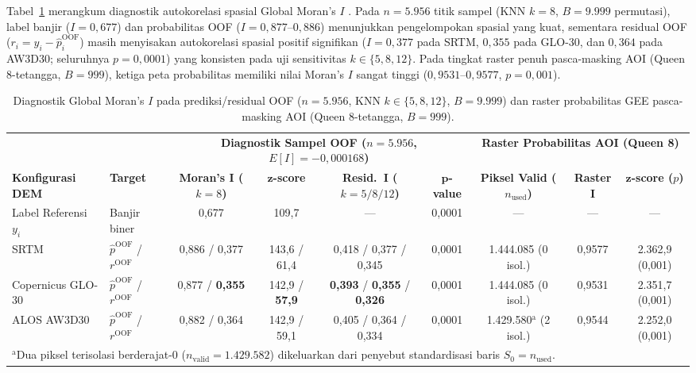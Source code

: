 \documentclass[11pt,twoside]{article}
\begin{document}
Tabel~\ref{tab:moran-id} merangkum diagnostik autokorelasi spasial Global Moran's $I$ \cite{moran1950}. Pada $n = 5.956$ titik sampel (KNN $k=8$, $B=9.999$ permutasi), label banjir ($I = 0{,}677$) dan probabilitas OOF ($I = 0{,}877\text{--}0{,}886$) menunjukkan pengelompokan spasial yang kuat, sementara residual OOF ($r_i = y_i - \hat{p}_i^{\text{OOF}}$) masih menyisakan autokorelasi spasial positif signifikan ($I = 0{,}377$ pada SRTM, $0{,}355$ pada GLO-30, dan $0{,}364$ pada AW3D30; seluruhnya $p = 0{,}0001$) yang konsisten pada uji sensitivitas $k \in \{5, 8, 12\}$. Pada tingkat raster penuh pasca-masking AOI (Queen 8-tetangga, $B = 999$), ketiga peta probabilitas memiliki nilai Moran's $I$ sangat tinggi ($0{,}9531\text{--}0{,}9577$, $p = 0{,}001$).

\begin{table}[!htbp]
\small
\centering
\caption{Diagnostik Global Moran's $I$ pada prediksi/residual OOF ($n = 5.956$, KNN $k \in \{5,8,12\}$, $B = 9.999$) dan raster probabilitas GEE pasca-masking AOI (Queen 8-tetangga, $B = 999$).}
\label{tab:moran-id}
\begin{adjustbox}{max width=\textwidth}
\begin{tabular}{ll cccc ccc}
\toprule
& & \multicolumn{4}{c}{\textbf{Diagnostik Sampel OOF ($n = 5.956$, $E[I]=-0{,}000168$)}} & \multicolumn{3}{c}{\textbf{Raster Probabilitas AOI (Queen 8)}} \\
\cmidrule(lr){3-6} \cmidrule(lr){7-9}
\textbf{Konfigurasi DEM} & \textbf{Target} & \textbf{Moran's $\boldsymbol{I}$ ($k=8$)} & $\boldsymbol{z}$\textbf{-score} & \textbf{Resid.\ $\boldsymbol{I}$ ($k=5 / 8 / 12$)} & $\boldsymbol{p}$\textbf{-value} & \textbf{Piksel Valid ($n_{\text{used}}$)} & \textbf{Raster $\boldsymbol{I}$} & $\boldsymbol{z}$\textbf{-score ($p$)} \\
\midrule
Label Referensi $y_i$ & Banjir biner & 0,677 & 109,7 & --- & 0,0001 & --- & --- & --- \\
SRTM & $\hat{p}^{\text{OOF}}$ / $r^{\text{OOF}}$ & 0,886 / 0,377 & 143,6 / 61,4 & 0,418 / 0,377 / 0,345 & 0,0001 & 1.444.085 (0 isol.) & 0,9577 & 2.362,9 (0,001) \\
Copernicus GLO-30 & $\hat{p}^{\text{OOF}}$ / $r^{\text{OOF}}$ & 0,877 / \textbf{0,355} & 142,9 / \textbf{57,9} & \textbf{0,393} / \textbf{0,355} / \textbf{0,326} & 0,0001 & 1.444.085 (0 isol.) & 0,9531 & 2.351,7 (0,001) \\
ALOS AW3D30 & $\hat{p}^{\text{OOF}}$ / $r^{\text{OOF}}$ & 0,882 / 0,364 & 142,9 / 59,1 & 0,405 / 0,364 / 0,334 & 0,0001 & 1.429.580$^{\text{a}}$ (2 isol.) & 0,9544 & 2.252,0 (0,001) \\
\bottomrule
\multicolumn{9}{l}{\scriptsize $^{\text{a}}$Dua piksel terisolasi berderajat-0 ($n_{\text{valid}} = 1.429.582$) dikeluarkan dari penyebut standardisasi baris $S_0 = n_{\text{used}}$.}
\end{tabular}
\end{adjustbox}
\end{table}
\end{document}
